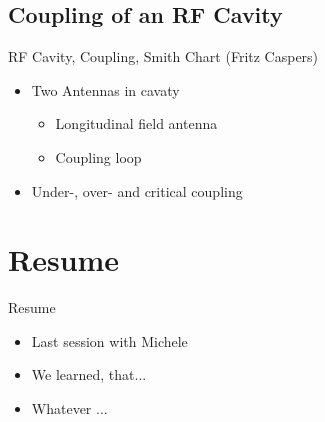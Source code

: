 \documentclass{beamer}
\begin{document}
\subsection{Coupling of an RF Cavity}
\begin{frame}[t,fragile]{RF Cavity, Coupling, Smith Chart (Fritz Caspers)}
\begin{itemize}
\item  Two Antennas in cavaty
\begin{itemize}
\item Longitudinal field antenna
\item Coupling loop
\end{itemize}
\item Under-, over- and critical coupling
\end{itemize}
\end{frame}

\section{Resume}
\begin{frame}[t,fragile]{Resume}
\begin{itemize}
\item Last session with Michele
\item We learned, that...
\item Whatever ...
\end{itemize}
\end{frame}
\end{document}
